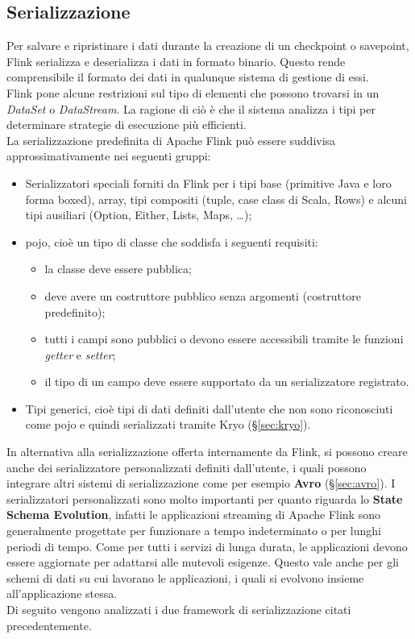 \subsection{Serializzazione}
Per salvare e ripristinare i dati durante la creazione di un checkpoint o savepoint, Flink serializza e deserializza i dati in formato binario. Questo rende comprensibile il formato dei dati in qualunque sistema di gestione di essi.\\
Flink pone alcune restrizioni sul tipo di elementi che possono trovarsi in un \textit{DataSet} o \textit{DataStream}. La ragione di ciò è che il sistema analizza i tipi per determinare strategie di esecuzione più efficienti.\\
La \gls{serializzazione} predefinita di Apache Flink può essere suddivisa approssimativamente nei seguenti gruppi:

\begin{itemize}
	\item{
Serializzatori speciali forniti da Flink per i tipi base (primitive Java e loro forma boxed), array, tipi compositi (tuple, case class di Scala, Rows) e alcuni tipi ausiliari (Option, Either, Lists, Maps, …);}
	\item{\gls{pojo}, cioè un tipo di classe che soddisfa i seguenti requisiti:
\begin{itemize}
	\item{la classe deve essere pubblica;}
	\item{deve avere un costruttore pubblico senza argomenti (costruttore predefinito);}
	\item{tutti i campi sono pubblici o devono essere accessibili tramite le funzioni \textit{getter} e \textit{setter};}
	\item{il tipo di un campo deve essere supportato da un serializzatore registrato.}
\end{itemize}}
	\item{Tipi generici, cioè tipi di dati definiti dall'utente che non sono riconosciuti come \gls{pojo} e quindi serializzati tramite Kryo (\S\ref{sec:kryo}).}
\end{itemize}
In alternativa alla \gls{serializzazione} offerta internamente da Flink, si possono creare anche dei serializzatore personalizzati definiti dall'utente, i quali possono integrare altri sistemi di \gls{serializzazione} come per esempio \textbf{Avro} (\S\ref{sec:avro}). I serializzatori personalizzati sono molto importanti per quanto riguarda lo \textbf{State Schema Evolution}, infatti le applicazioni streaming di Apache Flink sono generalmente progettate per funzionare a tempo indeterminato o per lunghi periodi di tempo. Come per tutti i servizi di lunga durata, le applicazioni devono essere aggiornate per adattarsi alle mutevoli esigenze. Questo vale anche per gli schemi di dati su cui lavorano le applicazioni, i quali si evolvono insieme all'applicazione stessa.\\
Di seguito vengono analizzati i due \gls{framework} di \gls{serializzazione} citati precedentemente.

